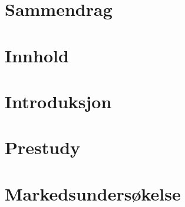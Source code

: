 \documentclass[11pt, a4paper]{report}
\newcommand{\comment}[1]{} \comment{This is a block comment wrapped in curly brackets}
\begin{document}



%
%

\tableofcontents
\newpage
{}


\comment{ foreløpig struktur på rapport:
Sammendrag
Innhold
Introduksjon
	Gruppen
	Initiativet
	Problemet
	Ideen
Pre study
	Mekanikk
	Hardware
	Software
Markedsundersøkelse
	generelt
	4 p'er
Løsning
	valg av løsning
	hardware
	software
		GUI
	diskusjon
Konklusjon
Referanseliste
Vedlegg
}
\chapter{Sammendrag}
\chapter{Innhold}
\chapter{Introduksjon}
	
		
	
\chapter{Prestudy}
	
\chapter{Markedsundersøkelse}
%
%
%


\end{document}
